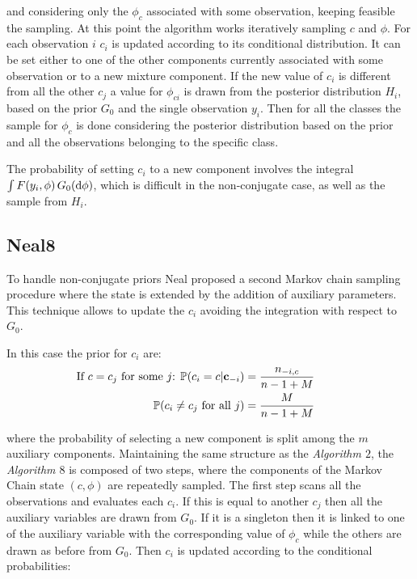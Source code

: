 and considering only the $\phi_c$ associated with some observation, keeping feasible the sampling. At this point the algorithm works iteratively sampling $c$ and $\phi$. For each observation $i$ $c_i$ is updated according to its conditional distribution. It can be set either to one of the other components currently associated with some observation or to a new mixture component.  If the new value of $c_i$ is different from all the other $c_j$ a value for $\phi_{ci}$ is drawn from the posterior distribution $H_i$, based on the prior $G_0$ and the single observation $y_i$. Then for all the classes the  sample for $\phi_c$ is done considering the posterior distribution based on the prior and all the observations belonging to the specific class.

The probability of setting $c_i$ to a new component involves the integral $\int F(y_{i},\phi) \, G_0(\mathrm d\phi)$, which is difficult in the non-conjugate case, as well as the sample from $H_i$.

\subsection{Neal8}
To handle non-conjugate priors Neal proposed a second Markov chain sampling procedure where the state is extended by the addition of auxiliary parameters.
This technique allows to update the $c_i$ avoiding the integration with respect to $G_0$.
 
In this case the prior for $c_i$ are:
\begin{align*}
            \hspace{-25pt}
            \vspace{-12pt}
                \text{If $c=c_j$ for some $j$: } \PP(c_i=c | \mathbf c_{-i}) &= \frac{n_{-i,c}}{n-1+M}  \\
                \PP(c_{i}\neq c_{j} \text{ for all } j) &=\frac{M }{n-1+M}                  
\end{align*}
            
            	
where the probability of selecting a new component is split among the $m$ auxiliary components.
Maintaining the same structure as the \textit{Algorithm $2$}, the \textit{Algorithm $8$} is composed of two steps, where the components of the Markov Chain state $(c,\phi)$ are repeatedly sampled. The first step scans all the observations and evaluates each $c_i$. If this is equal to another $c_j$ then all the auxiliary variables are drawn from $G_0$. If it is a singleton then it is linked to one of the auxiliary variable with the corresponding value of $\phi_c$ while the others are drawn as before from $G_0$. Then $c_i$ is updated according to the conditional probabilities:

